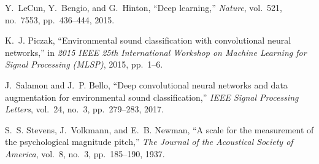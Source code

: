 \documentclass[conference]{IEEEtran}
\begin{document}
\begin{thebibliography}{00}
Y.~LeCun, Y.~Bengio, and G.~Hinton,
``Deep learning,''
\emph{Nature}, vol.~521, no.~7553, pp.~436--444, 2015.

K.~J. Piczak,
``Environmental sound classification with convolutional neural networks,''
in \emph{2015 IEEE 25th International Workshop on Machine Learning for Signal Processing (MLSP)}, 2015, pp.~1--6.

J.~Salamon and J.~P. Bello,
``Deep convolutional neural networks and data augmentation for environmental sound classification,''
\emph{IEEE Signal Processing Letters}, vol.~24, no.~3, pp.~279--283, 2017.

S.~S. Stevens, J.~Volkmann, and E.~B. Newman,
``A scale for the measurement of the psychological magnitude pitch,''
\emph{The Journal of the Acoustical Society of America}, vol.~8, no.~3, pp.~185--190, 1937.

\end{thebibliography}
\end{document}
